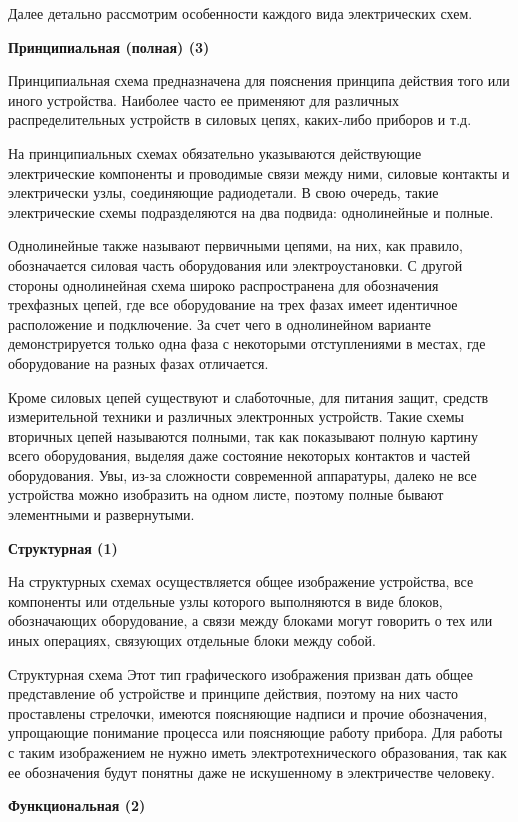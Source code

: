 \documentclass[%
	11pt,
	a4paper,
	utf8,
		]{article}
\begin{document}
Далее детально рассмотрим особенности каждого вида электрических схем.

\textbf{Принципиальная (полная) (3)}

Принципиальная схема предназначена для пояснения принципа действия того или иного устройства. Наиболее часто ее применяют для различных распределительных устройств в силовых цепях, каких-либо приборов и т.д.

На принципиальных схемах обязательно указываются действующие электрические компоненты и проводимые связи между ними, силовые контакты и электрически узлы, соединяющие радиодетали. В свою очередь, такие электрические схемы подразделяются на два подвида: однолинейные и полные.

Однолинейные также называют первичными цепями, на них, как правило, обозначается силовая часть оборудования или электроустановки. С другой стороны однолинейная схема широко распространена для обозначения трехфазных цепей, где все оборудование на трех фазах имеет идентичное расположение и подключение. За счет чего в однолинейном варианте демонстрируется только одна фаза с  некоторыми отступлениями в местах, где оборудование на разных фазах отличается.

Кроме силовых цепей существуют и слаботочные, для питания защит, средств измерительной техники и различных электронных устройств. Такие схемы вторичных цепей называются полными, так как показывают полную картину всего оборудования, выделяя даже состояние некоторых контактов и частей оборудования. Увы, из-за сложности современной аппаратуры, далеко не все устройства можно изобразить на одном листе, поэтому полные бывают элементными и развернутыми.

\textbf{Структурная (1)}

На структурных схемах осуществляется общее изображение устройства, все компоненты или отдельные узлы которого выполняются в виде блоков, обозначающих оборудование, а связи между блоками могут говорить о тех или иных операциях, связующих отдельные блоки между собой.

Структурная схема
Этот тип графического изображения  призван дать общее представление об устройстве и принципе действия, поэтому на них часто проставлены стрелочки, имеются поясняющие надписи и прочие обозначения, упрощающие понимание процесса или поясняющие работу прибора. Для работы с таким изображением не нужно иметь электротехнического образования, так как ее обозначения будут понятны даже не искушенному в электричестве человеку.


\textbf{Функциональная (2)}
\end{document}
